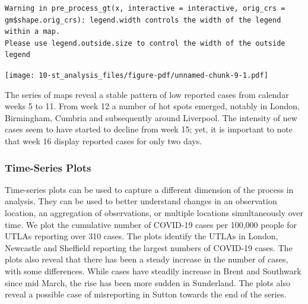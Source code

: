 \documentclass[
  letterpaper,
  DIV=11,
  numbers=noendperiod,
  oneside]{scrreprt}
\begin{document}
\begin{verbatim}
Warning in pre_process_gt(x, interactive = interactive, orig_crs =
gm$shape.orig_crs): legend.width controls the width of the legend within a map.
Please use legend.outside.size to control the width of the outside legend
\end{verbatim}

\texttt{[image: 10-st\_analysis\_files/figure-pdf/unnamed-chunk-9-1.pdf]}

The series of maps reveal a stable pattern of low reported cases from
calendar weeks 5 to 11. From week 12 a number of hot spots emerged,
notably in London, Birmingham, Cumbria and subsequently around
Liverpool. The intensity of new cases seem to have started to decline
from week 15; yet, it is important to note that week 16 display reported
cases for only two days.

\subsubsection{Time-Series Plots}\label{time-series-plots}

Time-series plots can be used to capture a different dimension of the
process in analysis. They can be used to better understand changes in an
observation location, an aggregation of observations, or multiple
locations simultaneously over time. We plot the cumulative number of
COVID-19 cases per 100,000 people for UTLAs reporting over 310 cases.
The plots identify the UTLAs in London, Newcastle and Sheffield
reporting the largest numbers of COVID-19 cases. The plots also reveal
that there has been a steady increase in the number of cases, with some
differences. While cases have steadily increase in Brent and Southwark
since mid March, the rise has been more sudden in Sunderland. The plots
also reveal a possible case of misreporting in Sutton towards the end of
the series.
\end{document}
